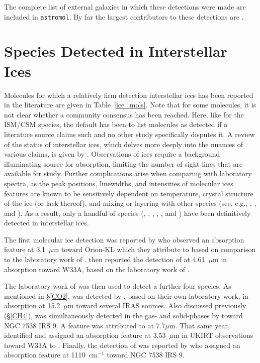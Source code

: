 \documentclass[twocolumn]{aastex631}
\newcommand{\update}[1]{{#1}}
\begin{document}
The complete list of external galaxies in which these detections were made are included in \update{\texttt{astromol}}.  By far the largest contributors to these detections are \update{ }.  


    
\section{Species Detected in Interstellar Ices}
\label{ices}

\update{Molecules for which a relatively firm detection interstellar ices has been reported in the literature are given in Table~\ref{ice_mols}.  {Note that for some molecules, it is not clear whether a community consensus has been reached.  Here, like for the ISM/CSM species, the default has been to list molecules as detected if a literature source claims such and no other study specifically disputes it.  A review of the status of interstellar ices, which delves more deeply into the nuances of various claims, is given by \citet{Boogert:2015fx}.}}  Observations of ices require a background illuminating source for absorption, limiting the number of sight lines that are available for study.  Further complications arise when comparing with laboratory spectra, as the peak positions, linewidths, and intensities of molecular ices features are known to be sensitively dependent on temperature, crystal structure of the ice (or lack thereof), and mixing or layering with other species (see, e.g., \citealt{Ehrenfreund:1997kj}, \citealt{Schutte:1999yc}, and \citealt{Cooke:2016hw}).  As a result, only a handful of species (, , , , , and ) have been definitively detected in interstellar ices.  



The first molecular ice detection was reported by \citet{1973ApJ...179..483G} who observed an absorption feature at 3.1~$\mu$m toward Orion-KL which they attribute to  based on comparison to the laboratory work of \citet{Irvine:1968fb}.  \citet{1979ApJ...232L..53S} then reported the detection of  at 4.61~$\mu$m in absorption toward W33A, based on the laboratory work of \citet{Mantz:1975ir}.  

The laboratory work of \citet{dHendecourt:1986wx} was then used to detect a further four species.  As mentioned in \S\ref{CO2},  was detected by \citet{1989A&A...223L...5D}, based on their own laboratory work, in absorption at 15.2~$\mu$m toward several IRAS sources.  Also discussed previously (\S\ref{CH4}),  was simultaneously detected in the gas- and solid-phases by \citet{1991ApJ...376..556L} toward NGC 7538 IRS 9.  A feature was attributed to  at 7.7$\mu$m.  That same year, \citet{1991A&A...243..473G} identified and assigned an absorption feature at 3.53~$\mu$m in UKIRT observations toward W33A to .  Finally, the detection of  was reported by \citet{1998ApJ...501L.105L} who assigned an absorption feature at 1110~cm$^{-1}$ toward NGC 7538 IRS 9.
\end{document}
